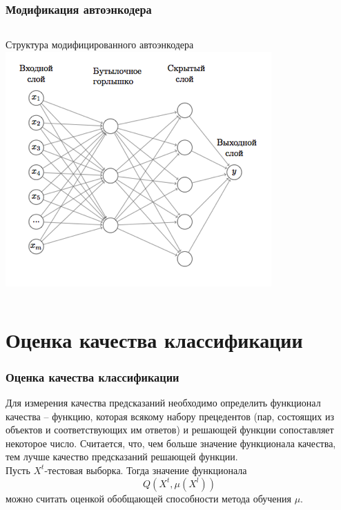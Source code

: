 \documentclass{beamer}
\begin{document}
\begin{frame}
\frametitle{Модификация автоэнкодера}
\begin{columns}[T]
    \begin{column}{1\textwidth}
    \begin{block}{Структура модифицированного автоэнкодера}
    \includegraphics[width=\linewidth,height=.7\textheight,keepaspectratio]{modified_encoder.png}
    \end{block}
    \end{column}
  \end{columns}
\end{frame}


\section{Оценка качества классификации}
\begin{frame}
\frametitle{Оценка качества классификации}
Для измерения качества предсказаний необходимо определить функционал
качества – функцию, которая всякому набору прецедентов (пар, состоящих из
объектов и соответствующих им ответов) и решающей функции сопоставляет
некоторое число. Считается, что, чем больше значение функционала качества, тем лучше качество предсказаний решающей функции.
\newline
\newline
\\
Пусть $X^t$-тестовая выборка. Тогда значение функционала $$Q(X^t,\mu(X^l))$$ можно считать оценкой обобщающей способности метода обучения $\mu$.
\end{frame}
\end{document}
